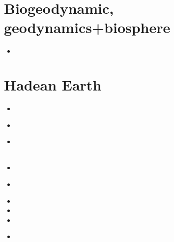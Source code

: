 \section{Biogeodynamic, geodynamics+biosphere}

\begin{small}
\begin{itemize}
\item[\twothousandtwentythree]
 \\
\end{itemize}
\end{small}


\section{Hadean Earth}

\begin{small}
\begin{itemize}
\item[\twothousandseven]     
 \\
\item[\twothousandthirteen]       
 \\ 
\item[\twothousandfourteen]       
 \\ 
 \\ 
\item[\twothousandsixteen] 
\item[\twothousandseventeen] 
 \\ 
\item[\twothousandeighteen] 
\item[\twothousandtwenty]
\item[\twothousandtwentyone]
\item[\twothousandtwentytwo]
 \\
\end{itemize}
\end{small}


